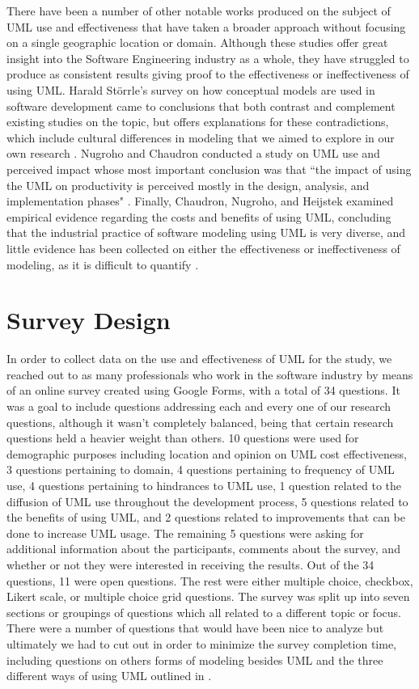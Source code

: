 \documentclass[letterpaper, 10 pt, conference]{ieeeconf}  %
\begin{document}
There have been a number of other notable works produced on the subject of UML use and effectiveness that have taken a broader approach without focusing on a single geographic location or domain. Although these studies offer great insight into the Software Engineering industry as a whole, they have struggled to produce as consistent results giving proof to the effectiveness or ineffectiveness of using UML. Harald Störrle's survey on how conceptual models are used in software development came to conclusions that both contrast and complement existing studies on the topic, but offers explanations for these contradictions, which include cultural differences in modeling that we aimed to explore in our own research \cite{c5}. Nugroho and Chaudron conducted a study on UML use and perceived impact whose most important conclusion was that ``the impact of using the UML on productivity is perceived mostly in the design, analysis, and implementation phases" \cite{c4}. Finally, Chaudron, Nugroho, and Heijstek examined empirical evidence regarding the costs and benefits of using UML, concluding that the industrial practice of software modeling using UML is very diverse, and little evidence has been collected on either the effectiveness or ineffectiveness of modeling, as it is difficult to quantify \cite{c7}.

\section{Survey Design}

In order to collect data on the use and effectiveness of UML for the study, we reached out to as many professionals who work in the software industry by means of an online survey created using Google Forms, with a total of 34 questions. It was a goal to include questions addressing each and every one of our research questions, although it wasn't completely balanced, being that certain research questions held a heavier weight than others. 10 questions were used for demographic purposes including location and opinion on UML cost effectiveness, 3 questions pertaining to domain, 4 questions pertaining to frequency of UML use, 4 questions pertaining to hindrances to UML use, 1 question related to the diffusion of UML use throughout the development process, 5 questions related to the benefits of using UML, and 2 questions related to improvements that can be done to increase UML usage. The remaining 5 questions were asking for additional information about the participants, comments about the survey, and whether or not they were interested in receiving the results. Out of the 34 questions, 11 were open questions. The rest were either multiple choice, checkbox, Likert scale, or multiple choice grid questions. The survey was split up into seven sections or groupings of questions which all related to a different topic or focus. There were a number of questions that would have been nice to analyze but ultimately we had to cut out in order to minimize the survey completion time, including questions on others forms of modeling besides UML and the three different ways of using UML outlined in \cite{fowler}.
\end{document}
